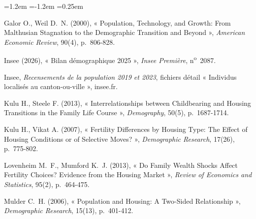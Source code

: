 \documentclass[11pt,a4paper]{article}
\theoremstyle{plain}
\theoremstyle{definition}
\theoremstyle{remark}
\begin{document}
\begin{list}{}{\leftmargin=1.2em \itemindent=-1.2em \itemsep=0.25em \parsep=0pt}
\item Galor O., Weil D.~N. (2000), « Population, Technology, and Growth: From Malthusian Stagnation to the Demographic Transition and Beyond », \emph{American Economic Review}, 90(4), p.~806-828.
\item Insee (2026), « Bilan démographique 2025 », \emph{Insee Première}, n\textsuperscript{o}~2087.
\item Insee, \emph{Recensements de la population 2019 et 2023}, fichiers détail « Individus localisés au canton-ou-ville », insee.fr.
\item Kulu H., Steele F. (2013), « Interrelationships between Childbearing and Housing Transitions in the Family Life Course », \emph{Demography}, 50(5), p.~1687-1714.
\item Kulu H., Vikat A. (2007), « Fertility Differences by Housing Type: The Effect of Housing Conditions or of Selective Moves? », \emph{Demographic Research}, 17(26), p.~775-802.
\item Lovenheim M.~F., Mumford K.~J. (2013), « Do Family Wealth Shocks Affect Fertility Choices? Evidence from the Housing Market », \emph{Review of Economics and Statistics}, 95(2), p.~464-475.
\item Mulder C.~H. (2006), « Population and Housing: A Two-Sided Relationship », \emph{Demographic Research}, 15(13), p.~401-412.
\end{list}
\end{document}

